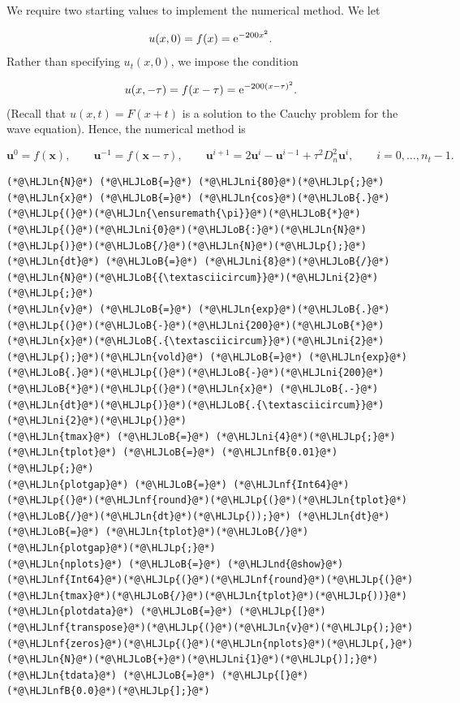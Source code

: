 \documentclass[12pt,a4paper]{article}
\newcommand{\HLJLn}[1]{#1}
\newcommand{\HLJLnd}[1]{\textcolor[RGB]{214,102,97}{#1}}
\newcommand{\HLJLnf}[1]{\textcolor[RGB]{66,102,213}{#1}}
\newcommand{\HLJLnfB}[1]{\textcolor[RGB]{59,151,46}{#1}}
\newcommand{\HLJLni}[1]{\textcolor[RGB]{59,151,46}{#1}}
\newcommand{\HLJLoB}[1]{\textcolor[RGB]{102,102,102}{\textbf{#1}}}
\newcommand{\HLJLp}[1]{#1}
\begin{document}
We require two starting values to implement the numerical method.  We let

\[
u(x,0) = f(x) = {\rm e}^{-200x^2}.
\]
Rather than specifying $u_t(x,0)$, we impose the condition

\[
u(x,-\tau) = f(x - \tau) = {\rm e}^{-200(x-\tau)^2}.
\]
(Recall that $u(x,t) = F(x+t)$ is a solution to the Cauchy problem for the wave equation).  Hence, the numerical method is 

\[
\mathbf{u}^{0} = f(\mathbf{x}), \qquad \mathbf{u}^{-1} = f(\mathbf{x}-\tau), \qquad \mathbf{u}^{i+1} = 2\mathbf{u}^{i} - \mathbf{u}^{i-1} + \tau^2 D_n^2\mathbf{u}^{i}, \qquad i = 0, \ldots, n_t-1.
\]

\begin{lstlisting}
(*@\HLJLn{N}@*) (*@\HLJLoB{=}@*) (*@\HLJLni{80}@*)(*@\HLJLp{;}@*) (*@\HLJLn{x}@*) (*@\HLJLoB{=}@*) (*@\HLJLn{cos}@*)(*@\HLJLoB{.}@*)(*@\HLJLp{(}@*)(*@\HLJLn{\ensuremath{\pi}}@*)(*@\HLJLoB{*}@*)(*@\HLJLp{(}@*)(*@\HLJLni{0}@*)(*@\HLJLoB{:}@*)(*@\HLJLn{N}@*)(*@\HLJLp{)}@*)(*@\HLJLoB{/}@*)(*@\HLJLn{N}@*)(*@\HLJLp{);}@*) (*@\HLJLn{dt}@*) (*@\HLJLoB{=}@*) (*@\HLJLni{8}@*)(*@\HLJLoB{/}@*)(*@\HLJLn{N}@*)(*@\HLJLoB{{\textasciicircum}}@*)(*@\HLJLni{2}@*)(*@\HLJLp{;}@*)
(*@\HLJLn{v}@*) (*@\HLJLoB{=}@*) (*@\HLJLn{exp}@*)(*@\HLJLoB{.}@*)(*@\HLJLp{(}@*)(*@\HLJLoB{-}@*)(*@\HLJLni{200}@*)(*@\HLJLoB{*}@*)(*@\HLJLn{x}@*)(*@\HLJLoB{.{\textasciicircum}}@*)(*@\HLJLni{2}@*)(*@\HLJLp{);}@*)(*@\HLJLn{vold}@*) (*@\HLJLoB{=}@*) (*@\HLJLn{exp}@*)(*@\HLJLoB{.}@*)(*@\HLJLp{(}@*)(*@\HLJLoB{-}@*)(*@\HLJLni{200}@*)(*@\HLJLoB{*}@*)(*@\HLJLp{(}@*)(*@\HLJLn{x}@*) (*@\HLJLoB{.-}@*) (*@\HLJLn{dt}@*)(*@\HLJLp{)}@*)(*@\HLJLoB{.{\textasciicircum}}@*)(*@\HLJLni{2}@*)(*@\HLJLp{)}@*)
(*@\HLJLn{tmax}@*) (*@\HLJLoB{=}@*) (*@\HLJLni{4}@*)(*@\HLJLp{;}@*) (*@\HLJLn{tplot}@*) (*@\HLJLoB{=}@*) (*@\HLJLnfB{0.01}@*)(*@\HLJLp{;}@*)
(*@\HLJLn{plotgap}@*) (*@\HLJLoB{=}@*) (*@\HLJLnf{Int64}@*)(*@\HLJLp{(}@*)(*@\HLJLnf{round}@*)(*@\HLJLp{(}@*)(*@\HLJLn{tplot}@*)(*@\HLJLoB{/}@*)(*@\HLJLn{dt}@*)(*@\HLJLp{));}@*) (*@\HLJLn{dt}@*) (*@\HLJLoB{=}@*) (*@\HLJLn{tplot}@*)(*@\HLJLoB{/}@*)(*@\HLJLn{plotgap}@*)(*@\HLJLp{;}@*)
(*@\HLJLn{nplots}@*) (*@\HLJLoB{=}@*) (*@\HLJLnd{@show}@*) (*@\HLJLnf{Int64}@*)(*@\HLJLp{(}@*)(*@\HLJLnf{round}@*)(*@\HLJLp{(}@*)(*@\HLJLn{tmax}@*)(*@\HLJLoB{/}@*)(*@\HLJLn{tplot}@*)(*@\HLJLp{))}@*)
(*@\HLJLn{plotdata}@*) (*@\HLJLoB{=}@*) (*@\HLJLp{[}@*)(*@\HLJLnf{transpose}@*)(*@\HLJLp{(}@*)(*@\HLJLn{v}@*)(*@\HLJLp{);}@*) (*@\HLJLnf{zeros}@*)(*@\HLJLp{(}@*)(*@\HLJLn{nplots}@*)(*@\HLJLp{,}@*)(*@\HLJLn{N}@*)(*@\HLJLoB{+}@*)(*@\HLJLni{1}@*)(*@\HLJLp{)];}@*) (*@\HLJLn{tdata}@*) (*@\HLJLoB{=}@*) (*@\HLJLp{[}@*)(*@\HLJLnfB{0.0}@*)(*@\HLJLp{];}@*)

\end{lstlisting}
\end{document}
